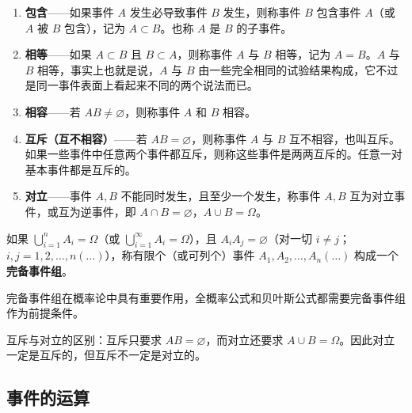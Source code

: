 \documentclass[lang=cn,11pt]{elegantbook}
\begin{document}
\begin{enumerate}
    \item \textbf{包含}——如果事件 \(A\) 发生必导致事件 \(B\) 发生，则称事件 \(B\) 包含事件 \(A\)（或 \(A\) 被 \(B\) 包含），记为 \(A \subset B\)。也称 \(A\) 是 \(B\) 的子事件。
    \item \textbf{相等}——如果 \(A \subset B\) 且 \(B \subset A\)，则称事件 \(A\) 与 \(B\) 相等，记为 \(A = B\)。\(A\) 与 \(B\) 相等，事实上也就是说，\(A\) 与 \(B\) 由一些完全相同的试验结果构成，它不过是同一事件表面上看起来不同的两个说法而已。
    \item \textbf{相容}——若 \(AB \neq \varnothing\)，则称事件 \(A\) 和 \(B\) 相容。
    \item \textbf{互斥（互不相容）}——若 \(AB = \varnothing\)，则称事件 \(A\) 与 \(B\) 互不相容，也叫互斥。如果一些事件中任意两个事件都互斥，则称这些事件是两两互斥的。任意一对基本事件都是互斥的。
    \item \textbf{对立}——事件 \(A, B\) 不能同时发生，且至少一个发生，称事件 \(A, B\) 互为对立事件，或互为逆事件，即 \(A \cap B = \varnothing\)，\(A \cup B = \Omega\)。
\end{enumerate}

\begin{definition}[完备事件组] \label{def:complete-event-group}
如果 \(\bigcup_{i=1}^{n} A_i = \Omega\)（或 \(\bigcup_{i=1}^{\infty} A_i = \Omega\)），且 \(A_i A_j = \varnothing\)（对一切 \(i \neq j\)；\(i, j = 1, 2, \dots, n(\dots)\)），称有限个（或可列个）事件 \(A_1, A_2, \dots, A_n(\dots)\) 构成一个\textbf{完备事件组}。
\end{definition}

完备事件组在概率论中具有重要作用，全概率公式和贝叶斯公式都需要完备事件组作为前提条件。

\begin{note}
互斥与对立的区别：互斥只要求 \(AB = \varnothing\)，而对立还要求 \(A \cup B = \Omega\)。因此对立一定是互斥的，但互斥不一定是对立的。
\end{note}

\subsection{事件的运算}
\end{document}
